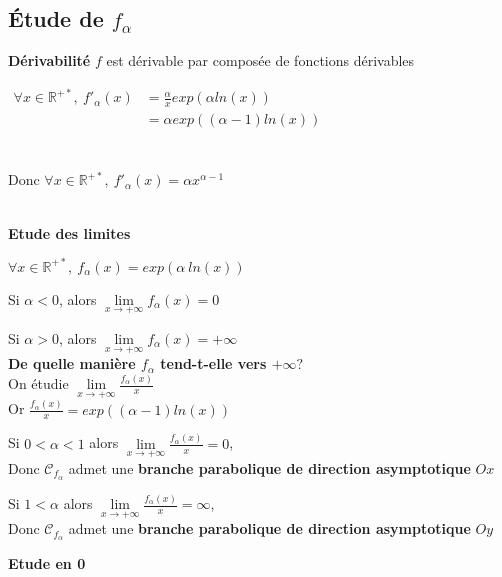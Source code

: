 \documentclass[12pt,twoside,a4paper]{article}
\begin{document}
		\subsection{\'Etude de $f_\alpha$}
			\textbf{D\'erivabilit\'e} $f$ est d\'erivable par compos\'ee de fonctions d\'erivables
				\begin{tab}
					$\begin{aligned}\forall x\in\mathbb{R}^{+*},\ f'_\alpha(x)&=\frac{\alpha}{x}exp(\alpha ln(x))\\
						&=\alpha exp((\alpha-1)ln(x))\end{aligned}$\\\\\\
						Donc $\forall x\in\mathbb{R}^{+*},\ f'_\alpha(x)=\alpha x^{\alpha-1}$
				\end{tab}\ \\
			\textbf{Etude des limites}
				\begin{tab}
					$\forall x\in\mathbb{R}^{+*},\ f_\alpha(x)=exp(\alpha\ ln(x))$
					\begin{liste}
						\item Si $\alpha<0$, alors $\lim\limits_{x\rightarrow+\infty}f_\alpha(x)=0$
						\item Si $\alpha>0$, alors $\lim\limits_{x\rightarrow+\infty}f_\alpha(x)=+\infty$\\
							\textbf{De quelle mani\`ere $f_\alpha$ tend-t-elle vers $+\infty?$}\\
								On \'etudie $\lim\limits_{x\rightarrow+\infty}\frac{f_\alpha(x)}{x}$\\
								Or $\frac{f_\alpha(x)}{x}=exp((\alpha-1)ln(x))$
								\begin{liste}
									\item Si $0<\alpha<1$ alors $\lim\limits_{x\rightarrow+\infty}\frac{f_\alpha(x)}{x}=0$,\\
											Donc $\mathscr{C}_{f_\alpha}$ admet une \textbf{branche parabolique de direction asymptotique} $Ox$
									\item Si $1<\alpha$ alors $\lim\limits_{x\rightarrow+\infty}\frac{f_\alpha(x)}{x}=\infty$,\\
										Donc $\mathscr{C}_{f_\alpha}$ admet une \textbf{branche parabolique de direction asymptotique} $Oy$
								\end{liste}
					\end{liste}
				\end{tab}\pagebreak
			\textbf{Etude en 0}
\end{document}
